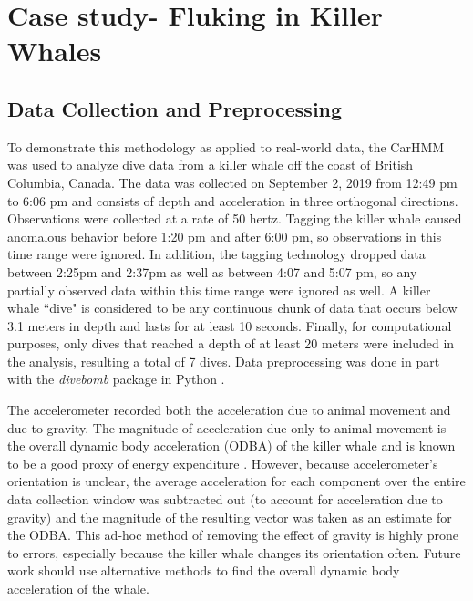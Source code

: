 
\section{Case study- Fluking in Killer Whales}

\subsection{Data Collection and Preprocessing}

To demonstrate this methodology as applied to real-world data, the CarHMM was used to analyze dive data from a killer whale off the coast of British Columbia, Canada. The data was collected on September 2, 2019 from 12:49 pm to 6:06 pm and consists of depth and acceleration in three orthogonal directions. Observations were collected at a rate of 50 hertz. Tagging the killer whale caused anomalous behavior before 1:20 pm and after 6:00 pm, so observations in this time range were ignored. In addition, the tagging technology dropped data between 2:25pm and 2:37pm as well as between 4:07 and 5:07 pm, so any partially observed data within this time range were ignored as well. A killer whale ``dive" is considered to be any continuous chunk of data that occurs below 3.1 meters in depth and lasts for at least 10 seconds. Finally, for computational purposes, only dives that reached a depth of at least 20 meters were included in the analysis, resulting a total of 7 dives. Data preprocessing was done in part with the \textit{divebomb} package in Python \cite{Nunes:2018}.

The accelerometer recorded both the acceleration due to animal movement and due to gravity. The magnitude of acceleration due only to animal movement is the overall dynamic body acceleration (ODBA) of the killer whale and is known to be a good proxy of energy expenditure \cite{Gleiss:2011}. However, because accelerometer's orientation is unclear, the average acceleration for each component over the entire data collection window was subtracted out (to account for acceleration due to gravity) and the magnitude of the resulting vector was taken as an estimate for the ODBA. This ad-hoc method of removing the effect of gravity is highly prone to errors, especially because the killer whale changes its orientation often. Future work should use alternative methods to find the overall dynamic body acceleration of the whale.

